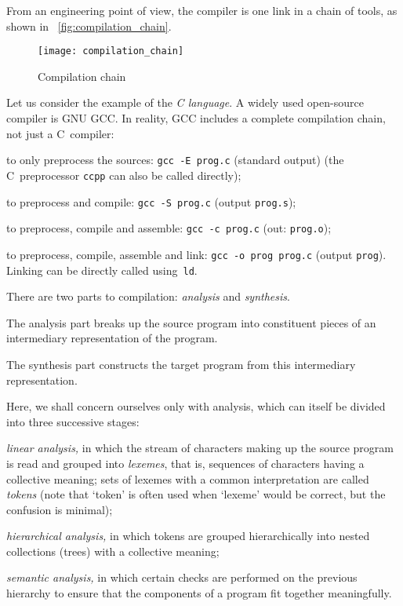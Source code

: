 From an engineering point of view, the compiler is one link in a chain
of tools, as shown in \fig~\vref{fig:compilation_chain}.
\begin{figure}
\centering
\texttt{[image: compilation\_chain]}
\caption{Compilation chain\label{fig:compilation_chain}}
\end{figure}
Let us consider the example of the \emph{C language}. A widely used
 open\hyp{}source compiler is GNU GCC. In reality, GCC includes a
 complete compilation chain, not just a C~compiler:
\begin{itemize*}

  \item to only preprocess the sources: \texttt{gcc -E prog.c}
  (standard output) (the C~preprocessor \texttt{ccpp} can also be
  called directly);

  \item to preprocess and compile: \texttt{gcc -S prog.c}
  (output \texttt{prog.s});

  \item to preprocess, compile and assemble: \texttt{gcc -c prog.c}
  (out: \texttt{prog.o});

  \item to preprocess, compile, assemble and link: \texttt{gcc -o prog
    prog.c} (output \texttt{prog}). Linking can be directly called
    using~\texttt{ld}.

\end{itemize*}
There are two parts to compilation: \emph{analysis} and
\emph{synthesis}.
\begin{enumerate*}
 
  \item The analysis part breaks up the source program into
  constituent pieces of an intermediary representation of the
  program.

  \item The synthesis part constructs the target program from this
  intermediary representation.

\end{enumerate*}
Here, we shall concern ourselves only with analysis, which can itself
be divided into three successive stages:
\begin{enumerate*}

  \item \emph{linear analysis,} in which the stream of characters
    making up the source program is read and grouped
    into \emph{lexemes}, that is, sequences of characters having a
    collective meaning; sets of lexemes with a common interpretation
    are called \emph{tokens} (note that `token' is often used when
    `lexeme' would be correct, but the confusion is minimal);

  \item \emph{hierarchical analysis,} in which tokens are grouped
    hierarchically into nested collections (trees) with a collective
    meaning;

  \item \emph{semantic analysis,} in which certain checks are
    performed on the previous hierarchy to ensure that the components
    of a program fit together meaningfully.

\end{enumerate*}
